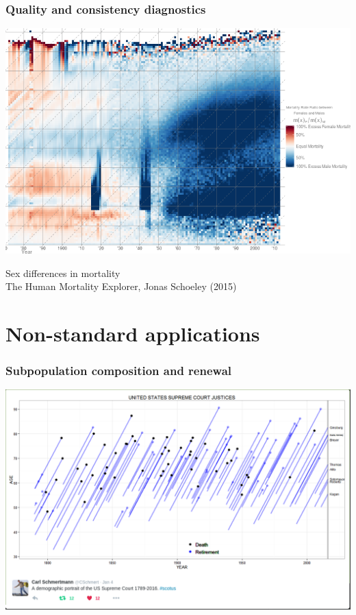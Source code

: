 \documentclass[20pt]{beamer}
\begin{document}


\begin{frame}
\frametitle{Quality and consistency diagnostics}
\begin{center}
\includegraphics[scale=.8]{Figures/Schoeley2.png}
\end{center}
Sex differences in mortality\\The Human Mortality Explorer, Jonas Schoeley
(2015)
\end{frame}


\section{Non-standard applications}

\begin{frame}
\frametitle{Subpopulation composition and renewal}
\includegraphics[scale=.65]{Figures/SchmertmannJustices.png}
\end{frame}
\end{document}
